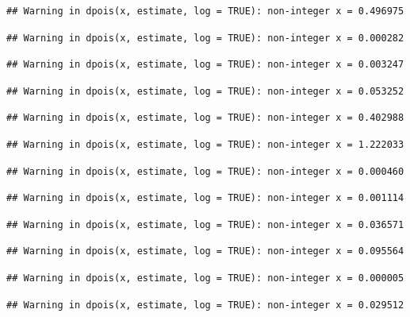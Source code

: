 \documentclass[]{article}
\begin{document}
\begin{verbatim}
## Warning in dpois(x, estimate, log = TRUE): non-integer x = 0.496975
\end{verbatim}

\begin{verbatim}
## Warning in dpois(x, estimate, log = TRUE): non-integer x = 0.000282
\end{verbatim}

\begin{verbatim}
## Warning in dpois(x, estimate, log = TRUE): non-integer x = 0.003247
\end{verbatim}

\begin{verbatim}
## Warning in dpois(x, estimate, log = TRUE): non-integer x = 0.053252
\end{verbatim}

\begin{verbatim}
## Warning in dpois(x, estimate, log = TRUE): non-integer x = 0.402988
\end{verbatim}

\begin{verbatim}
## Warning in dpois(x, estimate, log = TRUE): non-integer x = 1.222033
\end{verbatim}

\begin{verbatim}
## Warning in dpois(x, estimate, log = TRUE): non-integer x = 0.000460
\end{verbatim}

\begin{verbatim}
## Warning in dpois(x, estimate, log = TRUE): non-integer x = 0.001114
\end{verbatim}

\begin{verbatim}
## Warning in dpois(x, estimate, log = TRUE): non-integer x = 0.036571
\end{verbatim}

\begin{verbatim}
## Warning in dpois(x, estimate, log = TRUE): non-integer x = 0.095564
\end{verbatim}

\begin{verbatim}
## Warning in dpois(x, estimate, log = TRUE): non-integer x = 0.000005
\end{verbatim}

\begin{verbatim}
## Warning in dpois(x, estimate, log = TRUE): non-integer x = 0.029512
\end{verbatim}
\end{document}
